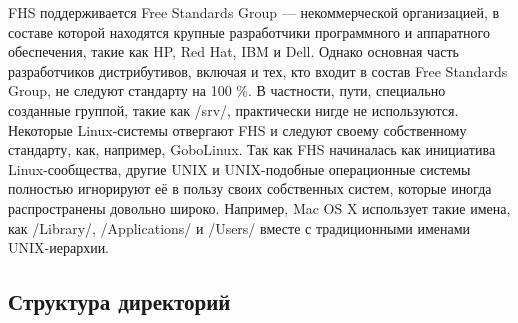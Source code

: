 FHS поддерживается Free Standards Group — некоммерческой организацией, в составе которой находятся крупные разработчики программного и аппаратного обеспечения, такие как HP, Red Hat, IBM и Dell. Однако основная часть разработчиков дистрибутивов, включая и тех, кто входит в состав Free Standards Group, не следуют стандарту на 100 \%. В частности, пути, специально созданные группой, такие как /srv/, практически нигде не используются. Некоторые Linux-системы отвергают FHS и следуют своему собственному стандарту, как, например, GoboLinux.
Так как FHS начиналась как инициатива Linux-сообщества, другие UNIX и UNIX-подобные операционные системы полностью игнорируют её в пользу своих собственных систем, которые иногда распространены довольно широко. Например, Mac OS X использует такие имена, как /Library/, /Applications/ и /Users/ вместе с традиционными именами UNIX-иерархии.
\subsection{Структура директорий}

